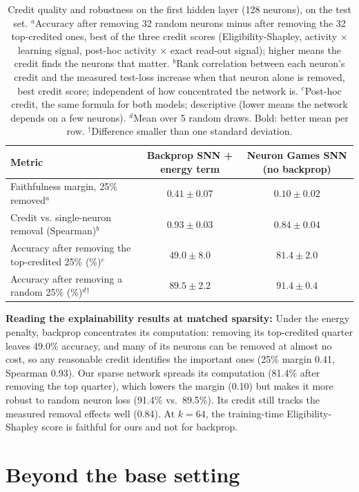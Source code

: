 \documentclass{article}
\begin{document}
\begin{table}[H]
\centering
\small
\caption{Credit quality and robustness on the first hidden layer (128 neurons), on the test set. $^a$Accuracy after removing 32 random neurons minus after removing the 32 top-credited ones, best of the three credit scores (Eligibility-Shapley, activity $\times$ learning signal, post-hoc activity $\times$ exact read-out signal); higher means the credit finds the neurons that matter. $^b$Rank correlation between each neuron's credit and the measured test-loss increase when that neuron alone is removed, best credit score; independent of how concentrated the network is. $^c$Post-hoc credit, the same formula for both models; descriptive (lower means the network depends on a few neurons). $^d$Mean over 5 random draws. Bold: better mean per row. $^\dagger$Difference smaller than one standard deviation.}
\label{tab:t2-credit}
\begin{tabular}{lcc}
\toprule
Metric & Backprop SNN + energy term & Neuron Games SNN (no backprop) \\
\midrule
Faithfulness margin, 25\% removed$^a$ & $\boldsymbol{0.41 \pm 0.07}$ & $0.10 \pm 0.02$ \\
Credit vs. single-neuron removal (Spearman)$^b$ & $\boldsymbol{0.93 \pm 0.03}$ & $0.84 \pm 0.04$ \\
\midrule
Accuracy after removing the top-credited 25\% (\%)$^c$ & $49.0 \pm 8.0$ & $81.4 \pm 2.0$ \\
Accuracy after removing a random 25\% (\%)$^d$$^\dagger$ & $89.5 \pm 2.2$ & $\boldsymbol{91.4 \pm 0.4}$ \\
\bottomrule
\end{tabular}
\end{table}

{\small
\noindent\textbf{Reading the explainability results at matched sparsity:} Under the energy penalty, backprop
concentrates its computation: removing its top-credited quarter leaves 49.0\% accuracy, and many of its neurons can
be removed at almost no cost, so any reasonable credit identifies the important ones (25\% margin 0.41, Spearman
0.93). Our sparse network spreads its computation (81.4\% after removing the top quarter), which lowers the margin
(0.10) but makes it more robust to random neuron loss (91.4\% vs.\ 89.5\%). Its credit still tracks the measured
removal effects well (0.84). At $k = 64$, the training-time Eligibility-Shapley score is faithful for ours and not
for backprop.
}

\clearpage
\section*{Beyond the base setting}
\end{document}
